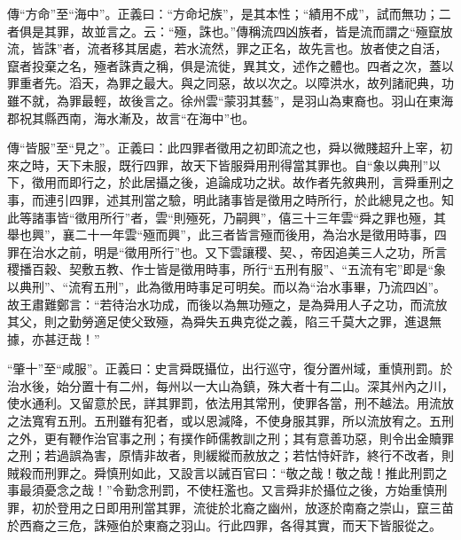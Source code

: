{\noindent\zhuan{}\fzbyks 傳“方命”至“海中”。正義曰：“方命圮族”，是其本性；“績用不成”，試而無功；二者俱是其罪，故並言之。云：“殛，誅也。”傳稱流四凶族者，皆是流而謂之“殛竄放流，皆誅”者，流者移其居處，若水流然，罪之正名，故先言也。放者使之自活，竄者投棄之名，殛者誅責之稱，俱是流徙，異其文，述作之體也。四者之次，蓋以罪重者先。滔天，為罪之最大。與之同惡，故以次之。以障洪水，故列諸祀典，功雖不就，為罪最輕，故後言之。徐州雲“蒙羽其藝”，是羽山為東裔也。羽山在東海郡祝其縣西南，海水漸及，故言“在海中”也。 \par}

{\noindent\zhuan{}\fzbyks 傳“皆服”至“見之”。正義曰：此四罪者徵用之初即流之也，舜以微賤超升上宰，初來之時，天下未服，既行四罪，故天下皆服舜用刑得當其罪也。自“象以典刑”以下，徵用而即行之，於此居攝之後，追論成功之狀。故作者先敘典刑，言舜重刑之事，而連引四罪，述其刑當之驗，明此諸事皆是徵用之時所行，於此總見之也。知此等諸事皆“徵用所行”者，雲“則殛死，乃嗣興”，僖三十三年雲“舜之罪也殛，其舉也興”，襄二十一年雲“殛而興”，此三者皆言殛而後用，為治水是徵用時事，四罪在治水之前，明是“徵用所行”也。又下雲讓稷、契、，帝因追美三人之功，所言稷播百穀、契敷五教、作士皆是徵用時事，所行“五刑有服”、“五流有宅”即是“象以典刑”、“流宥五刑”，此為徵用時事足可明矣。而以為“治水事畢，乃流四凶”。故王肅難鄭言：“若待治水功成，而後以為無功殛之，是為舜用人子之功，而流放其父，則之勤勞適足使父致殛，為舜失五典克從之義，陷三千莫大之罪，進退無據，亦甚迂哉！” \par}

{\noindent\shu{}\fzkt “肇十”至“咸服”。正義曰：史言舜既攝位，出行巡守，復分置州域，重慎刑罰。於治水後，始分置十有二州，每州以一大山為鎮，殊大者十有二山。深其州內之川，使水通利。又留意於民，詳其罪罰，依法用其常刑，使罪各當，刑不越法。用流放之法寬宥五刑。五刑雖有犯者，或以恩減降，不使身服其罪，所以流放宥之。五刑之外，更有鞭作治官事之刑；有撲作師儒教訓之刑；其有意善功惡，則令出金贖罪之刑；若過誤為害，原情非故者，則緩縱而赦放之；若怙恃奸詐，終行不改者，則賊殺而刑罪之。舜慎刑如此，又設言以誡百官曰：“敬之哉！敬之哉！推此刑罰之事最須憂念之哉！”令勤念刑罰，不使枉濫也。又言舜非於攝位之後，方始重慎刑罪，初於登用之日即用刑當其罪，流徙於北裔之幽州，放逐於南裔之崇山，竄三苗於西裔之三危，誅殛伯於東裔之羽山。行此四罪，各得其實，而天下皆服從之。 \par}

